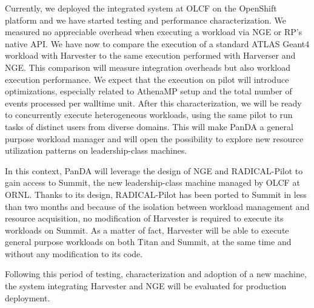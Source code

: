 \documentclass{webofc}
\begin{document}
Currently, we deployed the integrated system at OLCF on the OpenShift
platform and we have started testing and performance characterization. We
measured no appreciable overhead when executing a workload via NGE or RP's
native API. We have now to compare the execution of a standard ATLAS Geant4
workload with Harvester to the same execution performed with Harverser and
NGE. This comparison will measure integration overheads but also workload
execution performance. We expect that the execution on pilot will introduce
optimizations, especially related to AthenaMP setup and the total number of
events processed per walltime unit. After this characterization, we will be
ready to concurrently execute heterogeneous workloads, using the same pilot
to run tasks of distinct users from diverse domains. This will make PanDA a
general purpose workload manager and will open the possibility to explore new
resource utilization patterns on leadership-class machines.

In this context, PanDA will leverage the design of NGE and RADICAL-Pilot to
gain access to Summit, the new leadership-class machine managed by OLCF at
ORNL. Thanks to its design, RADICAL-Pilot has been ported to Summit in less
than two months and because of the isolation between workload management and
resource acquisition, no modification of Harvester is required to execute its
workloads on Summit. As a matter of fact, Harvester will be able to execute
general purpose workloads on both Titan and Summit, at the same time and
without any modification to its code.

Following this period of testing, characterization and adoption of a new
machine, the system integrating Harvester and NGE will be evaluated for
production deployment.



\end{document}

